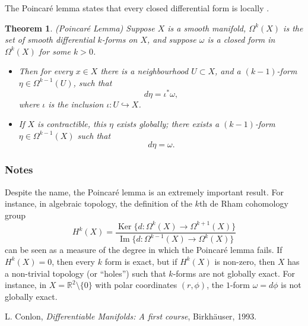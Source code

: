 \documentclass[12pt]{article}
\newtheorem*{theorem*}{Theorem}
\newcommand{\sR}[0]{\mathbb{R}}
\begin{document}

The Poincar\'e lemma states that every closed differential form
is locally . 

\begin{theorem*} (Poincar\'e Lemma)
\cite{conlon} Suppose $X$ is a smooth
manifold, $\Omega^k(X)$ is the set of smooth differential
$k$-forms on $X$, and suppose  $\omega$ is a closed form 
in $\Omega^k(X)$ for some $k>0$.
\begin{itemize}
\item
Then for every $x\in X$ there is a neighbourhood $U\subset X$, and a
$(k-1)$-form $\eta\in \Omega^{k-1}(U)$, such that
$$ d\eta = \iota^\ast \omega,$$
where $\iota$ is the inclusion $\iota:U\hookrightarrow X$.
\item If $X$ is contractible, this $\eta$ exists globally; there exists a
$(k-1)$-form $\eta\in \Omega^{k-1}(X)$ such that
$$ d\eta = \omega.$$
\end{itemize}
\end{theorem*}

\subsubsection*{Notes}
Despite the name, the Poincar\'e lemma is an
extremely important result. For instance, in algebraic topology,
the definition of the $k$th de Rham cohomology group
$$ 
  H^k(X) = \frac{ \operatorname{Ker}\{ d\colon \Omega^k(X)\to \Omega^{k+1}(X)\}}{  \operatorname{Im}\{ d\colon \Omega^{k-1}(X)\to \Omega^{k}(X)\}}
$$
can be seen as a measure of the degree in which the Poincar\'e lemma fails.
If $H^k(X)=0$, then every $k$ form is exact, but if $H^k(X)$ is non-zero, then
$X$ has a non-trivial topology (or ``holes'') such that $k$-forms are not
globally exact. For instance, in $X=\sR^2\setminus\{0\}$ with polar coordinates $(r,\phi)$,
the $1$-form $\omega=d\phi$ is not globally exact.


\begin{thebibliography}{9}
  L. Conlon, \emph{Differentiable Manifolds: A first course},
Birkh\"auser, 1993.
\end{thebibliography}
\end{document}
